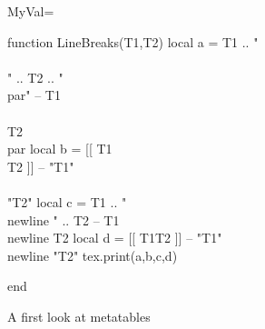 \documentclass{article}
\begin{document}
MyVal=

\begin{luacode}
function LineBreaks(T1,T2)
 local a = T1 .. "\\\\" .. T2 .. "\\par" -- T1\\\\T2\\par
 local b = [[ T1\\T2 ]]                  -- "T1"\\\\"T2"
 local c = T1 .. "\\newline " .. T2      -- T1\\newline T2
 local d = [[ T1\string\newline T2 ]]    -- "T1"\\newline "T2"
 tex.print(a,b,c,d)
 
end
\end{luacode}

A first look at metatables
\end{document}
